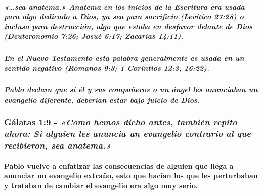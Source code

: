 \documentclass[11a pt,twoside]{article}
\newcommand{\scripture}[1]{%
  {\fontsize{12pt}{16pt}\selectfont\ScriptureFont\itshape #1}%
}
\let\oldsubsubsection\subsubsection
\renewcommand{\subsubsection}{\needspace{4\baselineskip}\oldsubsubsection}
\let\oldparagraph\paragraph
\renewcommand{\paragraph}{\needspace{3\baselineskip}\oldparagraph}
\let\oldsubparagraph\subparagraph
\renewcommand{\subparagraph}{\needspace{2\baselineskip}\oldsubparagraph}
\begin{document}
\subparagraph{\texorpdfstring{\scripture{«…sea anatema.»} Anatema en los
inicios de la Escritura era usada para algo dedicado a Dios, ya sea para
sacrificio (Levítico 27:28) o incluso para destrucción, algo que estaba
en desfavor delante de Dios (Deuteronomio 7:26; Josué 6:17; Zacarías
14:11).}{ Anatema en los inicios de la Escritura era usada para algo dedicado a Dios, ya sea para sacrificio (Levítico 27:28) o incluso para destrucción, algo que estaba en desfavor delante de Dios (Deuteronomio 7:26; Josué 6:17; Zacarías 14:11).}}\label{sea-anatema.-anatema-en-los-inicios-de-la-escritura-era-usada-para-algo-dedicado-a-dios-ya-sea-para-sacrificio-levuxedtico-2728-o-incluso-para-destrucciuxf3n-algo-que-estaba-en-desfavor-delante-de-dios-deuteronomio-726-josuuxe9-617-zacaruxedas-1411.}

\subparagraph{En el Nuevo Testamento esta palabra generalmente es usada
en un sentido negativo (Romanos 9:3; 1 Corintios 12:3,
16:22).}\label{en-el-nuevo-testamento-esta-palabra-generalmente-es-usada-en-un-sentido-negativo-romanos-93-1-corintios-123-1622.}

\subparagraph{Pablo declara que si él y sus compañeros o un ángel les
anunciaban un evangelio diferente, deberían estar bajo juicio de
Dios.}\label{pablo-declara-que-si-uxe9l-y-sus-compauxf1eros-o-un-uxe1ngel-les-anunciaban-un-evangelio-diferente-deberuxedan-estar-bajo-juicio-de-dios.}

\subsubsection{\texorpdfstring{Gálatas 1:9 -
\scripture{«Como hemos dicho antes, también repito ahora: Si alguien les anuncia un evangelio contrario al que recibieron, sea anatema.»}}{Gálatas 1:9 - }}\label{guxe1latas-19---como-hemos-dicho-antes-tambiuxe9n-repito-ahora-si-alguien-les-anuncia-un-evangelio-contrario-al-que-recibieron-sea-anatema.}

\paragraph{Pablo vuelve a enfatizar las consecuencias de alguien que
llega a anunciar un evangelio extraño, esto que hacían los que les
perturbaban y trataban de cambiar el evangelio era algo muy
serio.}\label{pablo-vuelve-a-enfatizar-las-consecuencias-de-alguien-que-llega-a-anunciar-un-evangelio-extrauxf1o-esto-que-hacuxedan-los-que-les-perturbaban-y-trataban-de-cambiar-el-evangelio-era-algo-muy-serio.}
\end{document}
